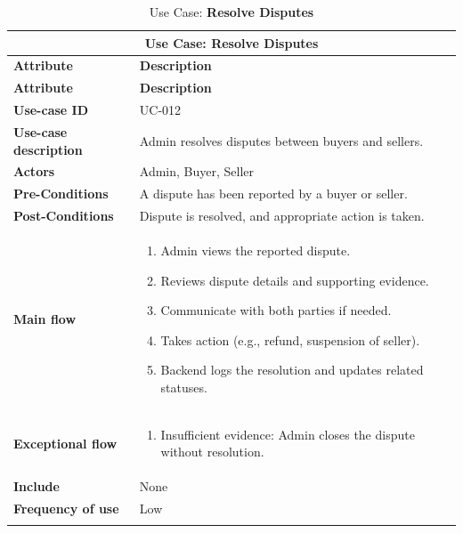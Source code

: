 \documentclass[12pt]{report}
\begin{document}
\begin{appendices}
	\begin{longtable}[H]{|l|p{9cm}||}
		\hline
		\multicolumn{2}{|c||}{\textbf{Use Case: Resolve Disputes}}                                               \\
		\hline
		\textbf{Attribute}            & \textbf{Description}                                                     \\
		\hline
		\endfirsthead
		\hline
		\textbf{Attribute}            & \textbf{Description}                                                     \\
		\hline
		\endhead
		\textbf{Use-case ID}          & UC-012                                                                   \\
		\hline
		\textbf{Use-case description} & Admin resolves disputes between buyers and sellers.                      \\
		\hline
		\textbf{Actors}               & Admin, Buyer, Seller                                                     \\
		\hline
		\textbf{Pre-Conditions}       & A dispute has been reported by a buyer or seller.                        \\
		\hline
		\textbf{Post-Conditions}      & Dispute is resolved, and appropriate action is taken.                    \\
		\hline
		\textbf{Main flow}            & \begin{enumerate}
			                                \item Admin views the reported dispute.
			                                \item Reviews dispute details and supporting evidence.
			                                \item Communicate with both parties if needed.
			                                \item Takes action (e.g., refund, suspension of seller).
			                                \item Backend logs the resolution and updates related statuses.
		                                \end{enumerate}           \\
		\hline
		\textbf{Exceptional flow}     & \begin{enumerate}
			                                \item Insufficient evidence: Admin closes the dispute without resolution.
		                                \end{enumerate} \\
		\hline
		\textbf{Include}              & None                                                                     \\
		\hline
		\textbf{Frequency of use}     & Low                                                                      \\
		\hline
		\hline
		\caption{Use Case: \textbf{Resolve Disputes}}\label{tab:tableReslolveDisputes}
	\end{longtable}


\end{appendices}
\end{document}
